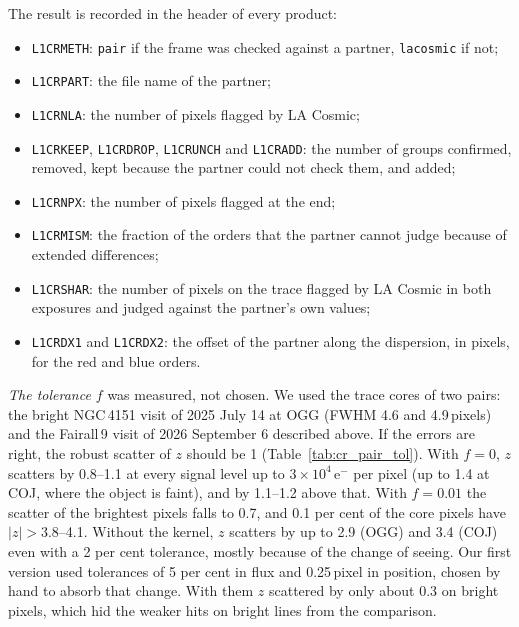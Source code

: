 The result is recorded in the header of every product:
\begin{itemize}
\item \texttt{L1CRMETH}: \texttt{pair} if the frame was checked against a partner, \texttt{lacosmic} if not;
\item \texttt{L1CRPART}: the file name of the partner;
\item \texttt{L1CRNLA}: the number of pixels flagged by LA Cosmic;
\item \texttt{L1CRKEEP}, \texttt{L1CRDROP}, \texttt{L1CRUNCH} and \texttt{L1CRADD}: the number of groups confirmed,
removed, kept because the partner could not check them, and added;
\item \texttt{L1CRNPX}: the number of pixels flagged at the end;
\item \texttt{L1CRMISM}: the fraction of the orders that the partner cannot judge because of extended differences;
\item \texttt{L1CRSHAR}: the number of pixels on the trace flagged by LA Cosmic in both exposures and judged against
the partner's own values;
\item \texttt{L1CRDX1} and \texttt{L1CRDX2}: the offset of the partner along the dispersion, in pixels, for the red and
blue orders.
\end{itemize}

\textit{The tolerance $f$} was measured, not chosen. We used the trace cores of two pairs: the bright NGC\,4151 visit
of 2025 July 14 at OGG (FWHM 4.6 and 4.9\,pixels) and the Fairall\,9 visit of 2026 September 6 described above. If the
errors are right, the robust scatter of $z$ should be 1 (Table~\ref{tab:cr_pair_tol}). With $f=0$, $z$ scatters by
0.8--1.1 at every signal level up to $3\times10^4$\,e$^-$ per pixel (up to 1.4 at COJ, where the object is faint), and
by 1.1--1.2 above that. With $f=0.01$ the scatter of the brightest pixels falls to 0.7, and 0.1 per cent of the core
pixels have $|z|>3.8$--4.1. Without the kernel, $z$ scatters by up to 2.9 (OGG) and 3.4 (COJ) even with a 2 per cent
tolerance, mostly because of the change of seeing. Our first version used tolerances of 5 per cent in flux and
0.25\,pixel in position, chosen by hand to absorb that change. With them $z$ scattered by only about 0.3 on bright
pixels, which hid the weaker hits on bright lines from the comparison.

